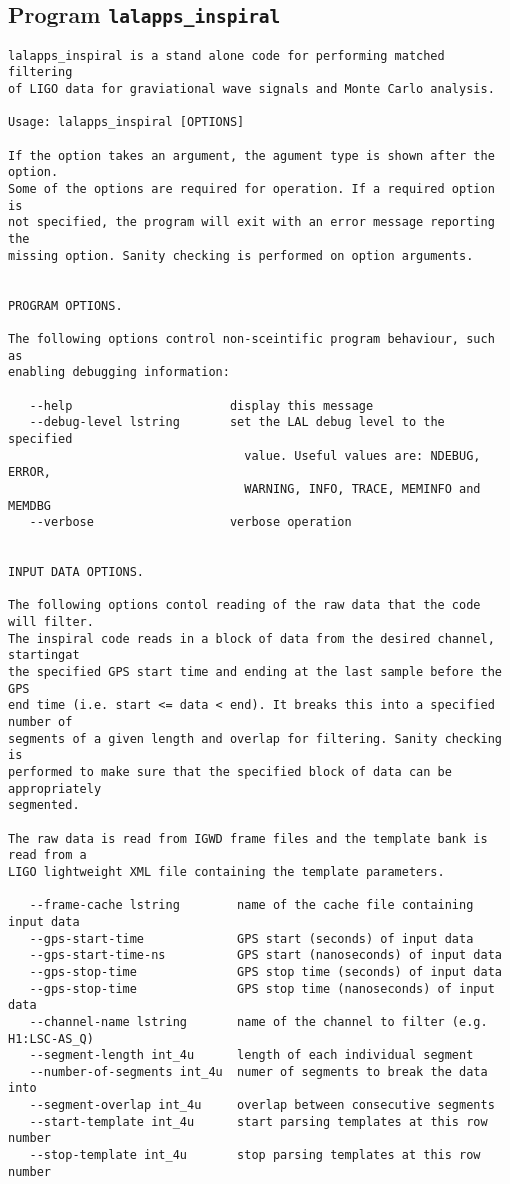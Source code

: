 \clearpage
\subsection{Program \texttt{lalapps\_inspiral}}
\label{program:lalapps-inspiral}

\begin{verbatim}
lalapps_inspiral is a stand alone code for performing matched filtering
of LIGO data for graviational wave signals and Monte Carlo analysis.

Usage: lalapps_inspiral [OPTIONS]

If the option takes an argument, the agument type is shown after the option.
Some of the options are required for operation. If a required option is
not specified, the program will exit with an error message reporting the
missing option. Sanity checking is performed on option arguments.


PROGRAM OPTIONS.

The following options control non-sceintific program behaviour, such as
enabling debugging information:

   --help                      display this message
   --debug-level lstring       set the LAL debug level to the specified
                                 value. Useful values are: NDEBUG, ERROR,
                                 WARNING, INFO, TRACE, MEMINFO and MEMDBG
   --verbose                   verbose operation


INPUT DATA OPTIONS.

The following options contol reading of the raw data that the code will filter.
The inspiral code reads in a block of data from the desired channel, startingat 
the specified GPS start time and ending at the last sample before the GPS
end time (i.e. start <= data < end). It breaks this into a specified number of 
segments of a given length and overlap for filtering. Sanity checking is 
performed to make sure that the specified block of data can be appropriately
segmented.

The raw data is read from IGWD frame files and the template bank is read from a
LIGO lightweight XML file containing the template parameters.

   --frame-cache lstring        name of the cache file containing input data
   --gps-start-time             GPS start (seconds) of input data
   --gps-start-time-ns          GPS start (nanoseconds) of input data
   --gps-stop-time              GPS stop time (seconds) of input data
   --gps-stop-time              GPS stop time (nanoseconds) of input data
   --channel-name lstring       name of the channel to filter (e.g. H1:LSC-AS_Q)
   --segment-length int_4u      length of each individual segment
   --number-of-segments int_4u  numer of segments to break the data into
   --segment-overlap int_4u     overlap between consecutive segments
   --start-template int_4u      start parsing templates at this row number
   --stop-template int_4u       stop parsing templates at this row number



\end{verbatim}

